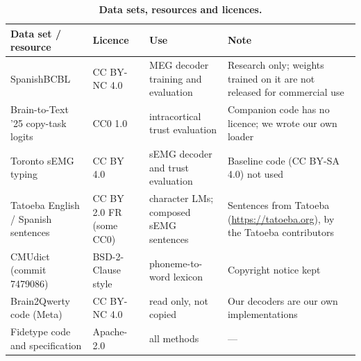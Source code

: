 \begin{table}[H]
  \centering
  \caption{\textbf{Data sets, resources and licences.}}
  \label{tab:licences}
  \small
  \begin{tabular}{@{}p{4.3cm}p{2.4cm}p{3.6cm}p{4.2cm}@{}}
    \toprule
    \textbf{Data set / resource} & \textbf{Licence} & \textbf{Use} & \textbf{Note} \\
    \midrule
    SpanishBCBL \citep{levy2026brain2qwerty,spanishbcbl} & CC BY-NC 4.0 & MEG decoder training and evaluation & Research only; weights trained on it are not released for commercial use \\
    Brain-to-Text '25 copy-task logits \citep{card2024accurate,card2025data} & CC0 1.0 & intracortical trust evaluation & Companion code has no licence; we wrote our own loader \\
    Toronto sEMG typing \citep{achituve2025emg,achituve2024data} & CC BY 4.0 & sEMG decoder and trust evaluation & Baseline code (CC BY-SA 4.0) not used \\
    Tatoeba English / Spanish sentences & CC BY 2.0 FR (some CC0) & character LMs; composed sEMG sentences & Sentences from Tatoeba (\url{https://tatoeba.org}), by the Tatoeba contributors \\
    CMUdict (commit 7479086) & BSD-2-Clause style & phoneme-to-word lexicon & Copyright notice kept \\
    Brain2Qwerty code (Meta) & CC BY-NC 4.0 & read only, not copied & Our decoders are our own implementations \\
    Fidetype code and specification & Apache-2.0 & all methods & --- \\
    \bottomrule
  \end{tabular}
\end{table}
